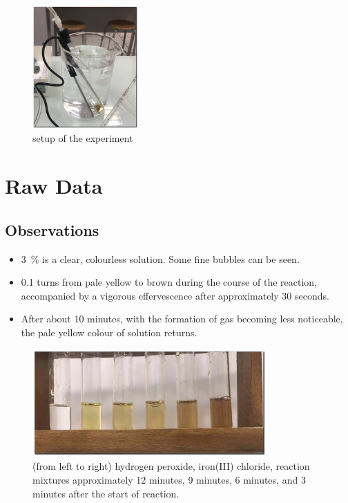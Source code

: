 \documentclass[a4paper, 12pt]{article}
\begin{document}
\begin{figure}[hbt]
    \centering
    \includegraphics[width=0.36\textwidth]{imgs/setup}
    \caption{setup of the experiment}
    \label{fig:setup}
\end{figure}


\section*{Raw Data}
\subsection*{Observations}
\begin{itemize}
    \item \SI{3}{\percent}  is a clear, colourless solution. Some fine bubbles can be seen.
    \item \SI{0.1}{\molar}  turns from pale yellow to brown during the course of the reaction, accompanied by a vigorous effervescence after approximately 30 seconds.
    \item After about 10 minutes, with the formation of gas becoming less noticeable, the pale yellow colour of  solution returns.
\end{itemize}

\begin{figure}[h!tb]
    \centering
    \includegraphics[width=0.8\textwidth]{imgs/colours}
    \caption{(from left to right) hydrogen peroxide, iron(III) chloride, reaction mixtures approximately 12 minutes, 9 minutes, 6 minutes, and 3 minutes after the start of reaction. }
    \label{fig:colours}
\end{figure}
\end{document}
